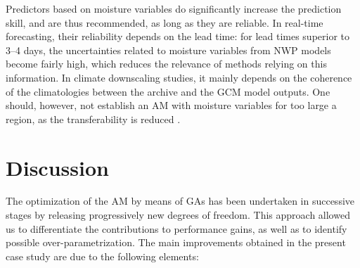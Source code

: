 \documentclass[review]{elsarticle}
\begin{document}
Predictors based on moisture variables do significantly increase the prediction skill, and are thus recommended, as long as they are reliable. In real-time forecasting, their reliability depends on the lead time: for lead times superior to 3--4 days, the uncertainties related to moisture variables from NWP models become fairly high, which reduces the relevance of methods relying on this information. In climate downscaling studies, it mainly depends on the coherence of the climatologies between the archive and the GCM model outputs. One should, however, not establish an AM with moisture variables for too large a region, as the transferability is reduced \citep[see][for alternative approaches]{Chardon2014}.


\section{Discussion}
\label{sec:discussion}

The optimization of the AM by means of GAs has been undertaken in successive stages by releasing progressively new degrees of freedom. This approach allowed us to differentiate the contributions to performance gains, as well as to identify possible over-parametrization. The main improvements obtained in the present case study are due to the following elements:
\end{document}

